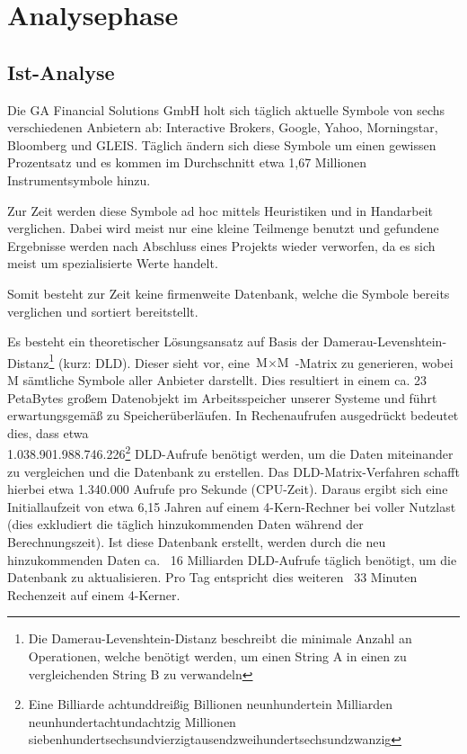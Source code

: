 \section{Analysephase}
\label{section:analysephase}
\subsection{Ist-Analyse}
Die GA Financial Solutions GmbH holt sich täglich aktuelle Symbole von sechs verschiedenen
Anbietern ab: Interactive Brokers, Google, Yahoo, Morningstar, Bloomberg und GLEIS.
Täglich ändern sich diese Symbole um einen gewissen Prozentsatz und es kommen im Durchschnitt etwa 1,67 Millionen Instrumentsymbole hinzu.\par

Zur Zeit werden diese Symbole ad hoc mittels Heuristiken und in Handarbeit verglichen.
Dabei wird meist nur eine kleine Teilmenge benutzt und gefundene Ergebnisse werden
nach Abschluss eines Projekts wieder verworfen, da es sich meist um spezialisierte Werte handelt.\par

Somit besteht zur Zeit keine firmenweite Datenbank, welche die Symbole
bereits verglichen und sortiert bereitstellt.\par

Es besteht ein theoretischer Lösungsansatz auf Basis der Damerau-Levenshtein-Distanz\footnote{Die Damerau-Levenshtein-Distanz\cite{dl_distance} beschreibt die minimale Anzahl
	an Operationen, welche benötigt werden, um einen String A in einen zu
	vergleichenden String B zu verwandeln} (kurz: DLD). Dieser sieht vor, eine $\text{M} \times \text{M}$ -Matrix zu generieren, wobei M sämtliche Symbole aller
Anbieter darstellt. Dies resultiert in einem ca. 23 PetaBytes großem Datenobjekt
im Arbeitsspeicher unserer Systeme und führt erwartungsgemäß zu Speicherüberläufen.
In Rechenaufrufen ausgedrückt bedeutet dies, dass etwa \\
1.038.901.988.746.226\footnote{Eine Billiarde achtunddreißig Billionen neunhundertein Milliarden neunhundertachtundachtzig Millionen siebenhundertsechsundvierzigtausendzweihundertsechsundzwanzig} DLD-Aufrufe benötigt werden, um die Daten miteinander
zu vergleichen und die Datenbank zu erstellen. Das DLD-Matrix-Verfahren schafft hierbei 
etwa 1.340.000 Aufrufe pro Sekunde (CPU-Zeit).
Daraus ergibt sich eine Initiallaufzeit von etwa 6,15 Jahren auf einem 4-Kern-Rechner bei voller Nutzlast (dies exkludiert die täglich hinzukommenden Daten
während der Berechnungszeit). Ist diese Datenbank erstellt, werden durch die neu
hinzukommenden Daten ca. ~16 Milliarden DLD-Aufrufe täglich benötigt, um die
Datenbank zu aktualisieren. Pro Tag entspricht dies weiteren ~33 Minuten Rechenzeit auf
einem 4-Kerner.\par

